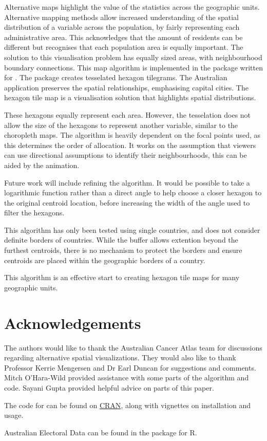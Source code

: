 \documentclass[
]{jss}
\begin{document}
Alternative maps highlight the value of the statistics across the
geographic units. Alternative mapping methods allow increased
understanding of the spatial distribution of a variable across the
population, by fairly representing each administrative area. This
acknowledges that the amount of residents can be different but
recognises that each population area is equally important. The solution
to this visualisation problem has equally sized areas, with
neighbourhood boundary connections. This map algorithm is implemented in
the  \citet{sugarbag} package written for 
\citet{R}. The  package creates tesselated hexagon
tilegrams. The Australian application preserves the spatial
relationships, emphasising capital cities. The hexagon tile map is a
visualisation solution that highlights spatial distributions.

These hexagons equally represent each area. However, the tesselation
does not allow the size of the hexagons to represent another variable,
similar to the choropleth maps. The algorithm is heavily dependent on
the focal points used, as this determines the order of allocation. It
works on the assumption that viewers can use directional assumptions to
identify their neighbourhoods, this can be aided by the animation.

Future work will include refining the algorithm. It would be possible to
take a logarithmic function rather than a direct angle to help choose a
closer hexagon to the original centroid location, before increasing the
width of the angle used to filter the hexagons.

This algorithm has only been tested using single countries, and does not
consider definite borders of countries. While the buffer allows
extention beyond the furthest centroids, there is no mechanism to
protect the borders and ensure centroids are placed within the
geographic borders of a country.

This algorithm is an effective start to creating hexagon tile maps for
many geographic units.

\hypertarget{acknowledgements}{%
\section{Acknowledgements}\label{acknowledgements}}

The authors would like to thank the Australian Cancer Atlas team for
discussions regarding alternative spatial visualizations. They would
also like to thank Professor Kerrie Mengersen and Dr Earl Duncan for
suggestions and comments. Mitch O'Hara-Wild provided assistance with
some parts of the algorithm and code. Sayani Gupta provided helpful
advice on parts of this paper.

The code for  \citep{sugarbag} can be found on
\href{https://cran.r-project.org/web/packages/sugarbag/index.html}{CRAN},
along with vignettes on installation and usage.

Australian Electoral Data can be found in the  package for
R.


\end{document}
